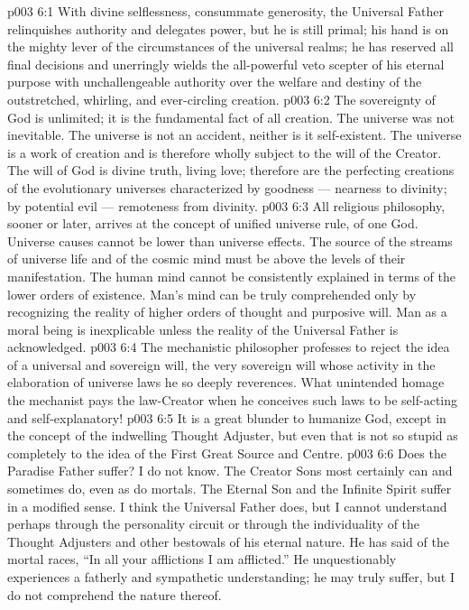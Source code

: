 \vs p003 6:1 With divine selflessness, consummate generosity, the Universal Father relinquishes authority and delegates power, but he is still primal; his hand is on the mighty lever of the circumstances of the universal realms; he has reserved all final decisions and unerringly wields the all\hyp{}powerful veto scepter of his eternal purpose with unchallengeable authority over the welfare and destiny of the outstretched, whirling, and ever\hyp{}circling creation.
\vs p003 6:2 The sovereignty of God is unlimited; it is the fundamental fact of all creation. The universe was not inevitable. The universe is not an accident, neither is it self\hyp{}existent. The universe is a work of creation and is therefore wholly subject to the will of the Creator. The will of God is divine truth, living love; therefore are the perfecting creations of the evolutionary universes characterized by goodness --- nearness to divinity; by potential evil --- remoteness from divinity.
\vs p003 6:3 \pc All religious philosophy, sooner or later, arrives at the concept of unified universe rule, of one God. Universe causes cannot be lower than universe effects. The source of the streams of universe life and of the cosmic mind must be above the levels of their manifestation. The human mind cannot be consistently explained in terms of the lower orders of existence. Man’s mind can be truly comprehended only by recognizing the reality of higher orders of thought and purposive will. Man as a moral being is inexplicable unless the reality of the Universal Father is acknowledged.
\vs p003 6:4 The mechanistic philosopher professes to reject the idea of a universal and sovereign will, the very sovereign will whose activity in the elaboration of universe laws he so deeply reverences. What unintended homage the mechanist pays the law\hyp{}Creator when he conceives such laws to be self\hyp{}acting and self\hyp{}explanatory!
\vs p003 6:5 It is a great blunder to humanize God, except in the concept of the indwelling Thought Adjuster, but even that is not so stupid as completely to  the idea of the First Great Source and Centre.
\vs p003 6:6 \pc Does the Paradise Father suffer? I do not know. The Creator Sons most certainly can and sometimes do, even as do mortals. The Eternal Son and the Infinite Spirit suffer in a modified sense. I think the Universal Father does, but I cannot understand  perhaps through the personality circuit or through the individuality of the Thought Adjusters and other bestowals of his eternal nature. He has said of the mortal races, “In all your afflictions I am afflicted.” He unquestionably experiences a fatherly and sympathetic understanding; he may truly suffer, but I do not comprehend the nature thereof.
